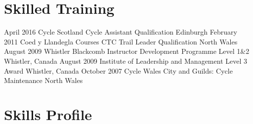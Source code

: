 \documentclass{moderncv}
\begin{document}
\section{Skilled Training}
	\cventry
		{}
		{April 2016}
		{Cycle Scotland}
		{Cycle Assistant Qualification}
		{Edinburgh}
		{}
	\cventry
		{}
		{February 2011}
		{Coed y Llandegla Courses}
		{CTC Trail Leader Qualification}
		{North Wales}
		{}
	\cventry
		{}
		{August 2009}
		{Whistler Blackcomb}
		{Instructor Development Programme Level 1\&2}
		{Whistler, Canada}
		{}
	\cventry
		{}
		{August 2009}
		{Institute of Leadership and Management}
		{Level 3 Award}
		{Whistler, Canada}
		{}
	\cventry
		{}
		{October 2007}
		{Cycle Wales}
		{City and Guilds: Cycle Maintenance}
		{North Wales}
		{}
\section{Skills Profile}
\begin{comment}
\section{Interests and Achievements}
\cvlistitem{{\bfseries Mountain Biking} 12 years experience, Competed in multiple races, Volunteer with Sustrans}
\cvlistitem{{\bfseries Motorsports/Transport} Formula student, Watch WEC and Rally,  Follow self driving technology}
\cvlistitem{{\bfseries Science/Tech} Up to date with news and products, Space travel, Watch event streams}
\end{comment}
\end{document}
